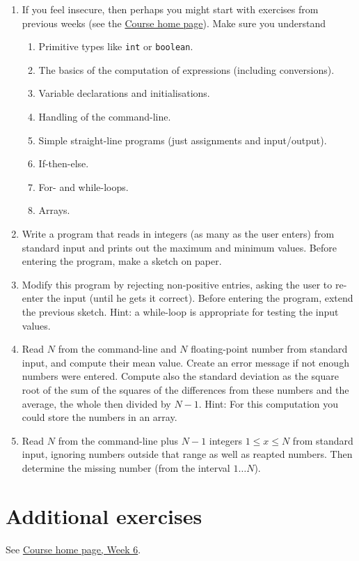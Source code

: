 \documentclass[11pt]{article}
\newcommand{\inl}[1]{\lstinline$#1$}
\begin{document}
\begin{enumerate}
\item If you feel insecure, then perhaps you might start with exercises from previous weeks (see the \href{\chp}{Course home page}). Make sure you understand
  \begin{enumerate}
  \item Primitive types like \inl{int} or \inl{boolean}.
  \item The basics of the computation of expressions (including conversions).
  \item Variable declarations and initialisations.
  \item Handling of the command-line.
  \item Simple straight-line programs (just assignments and input/output).
  \item If-then-else.
  \item For- and while-loops.
  \item Arrays.
  \end{enumerate}
\item Write a program that reads in integers (as many as the user enters) from standard input and prints out the maximum and minimum values. Before entering the program, make a sketch on paper.
\item Modify this program by rejecting non-positive entries, asking the user to re-enter the input (until he gets it correct). Before entering the program, extend the previous sketch. Hint: a while-loop is appropriate for testing the input values.
\item Read $N$ from the command-line and $N$ floating-point number from standard input, and compute their mean value. Create an error message if not enough numbers were entered. Compute also the standard deviation as the square root of the sum of the squares of the differences from these numbers and the average, the whole then divided by $N-1$. Hint: For this computation you could store the numbers in an array.
\item Read $N$ from the command-line plus $N-1$ integers $1 \le x \le N$ from standard input, ignoring numbers outside that range as well as reapted numbers. Then determine the missing number (from the interval $1 \dots N$).
\end{enumerate}


\section{Additional exercises}
\label{sec:addex}

See \href{\chp#ExercisesWeek06}{Course home page, Week 6}.
\end{document}

